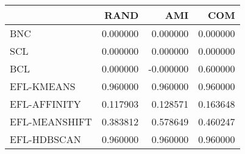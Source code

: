 \begin{tabular}{lrrr}
\toprule
 & RAND & AMI & COM \\
\midrule
BNC & 0.000000 & 0.000000 & 0.000000 \\
SCL & 0.000000 & 0.000000 & 0.000000 \\
BCL & 0.000000 & -0.000000 & 0.600000 \\
EFL-KMEANS & 0.960000 & 0.960000 & 0.960000 \\
EFL-AFFINITY & 0.117903 & 0.128571 & 0.163648 \\
EFL-MEANSHIFT & 0.383812 & 0.578649 & 0.460247 \\
EFL-HDBSCAN & 0.960000 & 0.960000 & 0.960000 \\
\bottomrule
\end{tabular}
